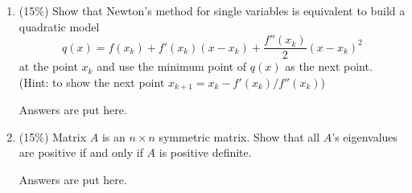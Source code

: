 \documentclass[a4paper,10pt]{article}
\begin{document}
\begin{enumerate}
\begin{enumerate}
		\item (10\%) For the search direction, show that to find the minimum point, if $f(x_4)=f_{4a}$, the triplet $\{x_1,x_2,x_4\}$ is chosen for the next iteration. If $f(x_4)=f_{4b}$, the triplet $\{x_2, x_4, x_3\}$ is chosen. (Hint: use the property of unimodal.)
    \item (10\%) For either case, we want these three points keep the same ratio, which means
    $$\frac{a}{b} = \frac{c}{a} = \frac{c}{b-c}.$$
    Show that under this condition, the ratio of $b/a=(\sqrt{5}+1)/2$, which is the golden ratio $\phi$. (So this algorithm is called the \emph{Golden-section search}).
    \item (10\%) If we let each iteration of the algorithm has two function evaluations, show the convergence rate of the Golden-section search is  $\phi^{-2}$.  (This means it is faster than the binary search algorithm under the same number of function evaluations.)  
    \end{enumerate}

{\color{blue} Answers are put here. 

    \begin{CJK*}{UTF8}{bsmi}

\end{CJK*}

}

\item (15\%) Show that Newton's method for single variables is equivalent to build a quadratic model 
$$q(x) = f(x_k) + f'(x_k)(x-x_k) + \frac{f''(x_k)}{2}(x-x_k)^2$$
at the point $x_k$ and use the minimum point of $q(x)$ as the next point.  (Hint: to show the next point $x_{k+1} = x_k -f'(x_k)/f''(x_k)$) 

{\color{blue} Answers are put here. 

    \begin{CJK*}{UTF8}{bsmi}

\end{CJK*}

}

\item (15\%) Matrix $A$ is an $n\times n$ symmetric matrix.  Show that  
all $A$'s eigenvalues are positive if and only if $A$ is positive definite. 

{\color{blue} Answers are put here. 

    \begin{CJK*}{UTF8}{bsmi}

\end{CJK*}

}
\end{enumerate}
\end{document}
